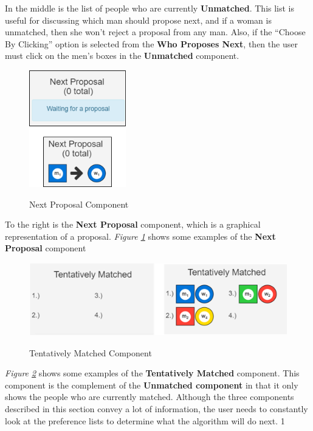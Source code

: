 In the middle is the list of people who are currently \textbf{Unmatched}. 
This list is useful for discussing which man should propose next, 
and if a woman is unmatched, then she won't reject a proposal from any man. 
Also, if the ``Choose By Clicking'' option is selected
from the \textbf{Who Proposes Next}, then the 
user must click on the men's boxes in the \textbf{Unmatched} component. 
\newline\newline
\begin{figure}[H]
  \caption{Next Proposal Component}
  \includegraphics[height=2in]
  {images/stable-marriage/next-proposal.png}
  \label{fig-next-proposal}
  \centering
\end{figure}
To the right is the \textbf{Next Proposal} component, 
which is a graphical representation of a proposal. 
\textit{Figure \ref{fig-next-proposal}} shows some examples 
of the \textbf{Next Proposal} component
\begin{figure}[H]
  \caption{Tentatively Matched Component}
  \includegraphics[height=1.25in]
  {images/stable-marriage/tentative.png}
  \label{fig-tentative}
  \centering
\end{figure}
\textit{Figure \ref{fig-tentative}} shows some examples of the 
\textbf{Tentatively Matched} component. 
This component is the complement of the \textbf{Unmatched component} in that
it only shows the people who are currently matched. 
\newline\newline
Although the three components described in this section convey a lot of information,
the user needs to constantly look at the preference lists to determine what 
the algorithm will do next. 1
